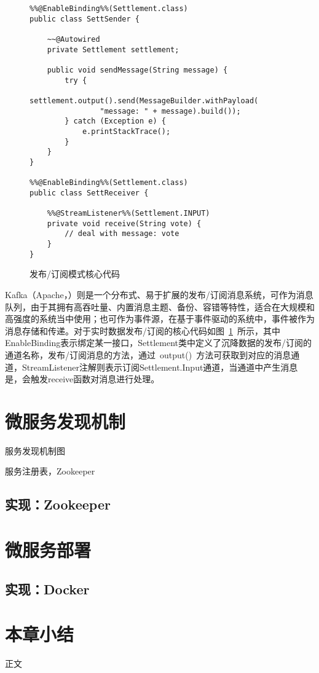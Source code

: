 \begin{figure}[htb!]
\centering
\begin{minipage}[t]{1.0\linewidth}
\begin{lstlisting}
%%@EnableBinding%%(Settlement.class)  
public class SettSender {  
      
    ~~@Autowired  
    private Settlement settlement;  
      
    public void sendMessage(String message) {  
	    try {  
	        settlement.output().send(MessageBuilder.withPayload(
	        	"message: " + message).build());  
	    } catch (Exception e) {  
	        e.printStackTrace();  
	    }  
    }  
}

%%@EnableBinding%%(Settlement.class)  
public class SettReceiver {  
  
    %%@StreamListener%%(Settlement.INPUT)  
    private void receive(String vote) {  
        // deal with message: vote
    }     
}  
\end{lstlisting}
\end{minipage} 
\caption{发布/订阅模式核心代码}
\label{fig:发布订阅模式核心代码}
\end{figure}

Kafka（Apache，\citeyear{kafka2017}）则是一个分布式、易于扩展的发布/订阅消息系统，可作为消息队列，由于其拥有高吞吐量、内置消息主题、备份、容错等特性，适合在大规模和高强度的系统当中使用；也可作为事件源，在基于事件驱动的系统中，事件被作为消息存储和传递。对于实时数据发布/订阅的核心代码如图~\ref{fig:发布订阅模式核心代码}~所示，其中EnableBinding表示绑定某一接口，Settlement类中定义了沉降数据的发布/订阅的通道名称，发布/订阅消息的方法，通过~output()~方法可获取到对应的消息通道，StreamListener注解则表示订阅Settlement.Input通道，当通道中产生消息是，会触发receive函数对消息进行处理。

\section{微服务发现机制}
\label{chap:service-discovery}

服务发现机制图

服务注册表，Zookeeper

\subsection{实现：Zookeeper}


\section{微服务部署}

\subsection{实现：Docker}





\section{本章小结}

正文